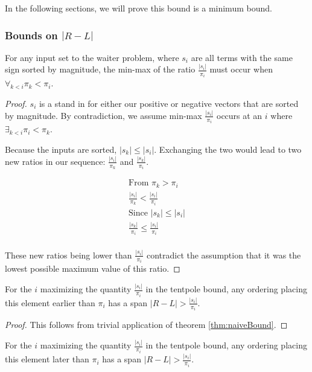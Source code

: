 In the following sections, we will prove this bound is a minimum bound.

\subsubsection{Bounds on $|R - L|$}

\begin{lem} \label{lem:increasingOrder} 
For any input set to the waiter problem, where $s_i$ are all terms with the same sign sorted by magnitude, the min-max of the ratio $\frac{|s_i|}{\pi_i}$ must occur when $\forall_{k<i} \pi_k < \pi_i$.  
\end{lem}

\begin{proof}
$s_i$ is a stand in for either our positive or negative vectors that are sorted by magnitude. By contradiction, we assume min-max $\frac{|s_i|}{\pi_i}$ occurs at an $i$ where $\exists_{k<i} \pi_i < \pi_k$.  

Because the inputs are sorted, $|s_k| \leq |s_i|$.  Exchanging the two would lead to two new ratios in our sequence: $\frac{|s_i|}{\pi_k}$ and $\frac{|s_k|}{\pi_i}$.

\begin{eqnarray*}
\textrm{From } \pi_k > \pi_i \\
\frac{|s_i|}{\pi_k} < \frac{|s_i|}{\pi_i} \\
\textrm{Since } |s_k| \leq |s_i| \\
\frac{|s_k|}{\pi_i} \leq \frac{|s_i|}{\pi_i} \\
\end{eqnarray*}

These new ratios being lower than $\frac{|s_i|}{\pi_i}$ contradict the assumption that it was the lowest possible maximum value of this ratio.
\end{proof}

\begin{lem} \label{lem:tentBeforeBad}
For the $i$ maximizing the quantity $\frac{|s_i|}{\pi_i}$ in the tentpole bound, any ordering placing this element earlier than $\pi_i$ has a span $|R-L| > \frac{|s_i|}{\pi_i}$.
\end{lem}

\begin{proof}
This follows from trivial application of theorem \ref{thm:naiveBound}.
\end{proof}

\begin{lem} \label{lem:tentAfterBad}
For the $i$ maximizing the quantity $\frac{|s_i|}{\pi_i}$ in the tentpole bound, any ordering placing this element later than $\pi_i$  has a span $|R-L| > \frac{|s_i|}{\pi_i}$.
\end{lem}

